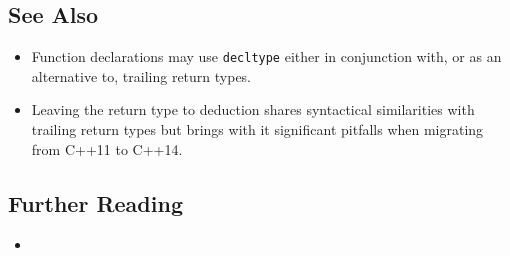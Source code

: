 \hspace{\fill}

\subsection[See Also]{See Also}\label{see-also}

\begin{itemize}
\item{%
Function declarations may use \lstinline!decltype! either in conjunction with, or as an alternative to, trailing return types.}
\item{%
Leaving the return type to deduction shares syntactical similarities with trailing return types but brings with it significant pitfalls when migrating from C++11 to C++14.}
\end{itemize}

\subsection[Further Reading]{Further Reading}\label{further-reading}

\begin{itemize}
\item{\cite{mertz18}}
\end{itemize}


